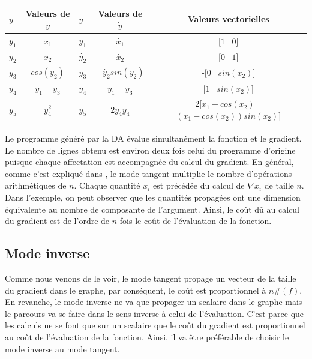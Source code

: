 \vspace{1cm}
\begin{tabular}{|l|c|l|c|c|}
  \hline
  $y$ & Valeurs de $y$ & $\dot{y}$ & Valeurs de $\dot{y}$ & Valeurs vectorielles
\\
  \hline
  $y_1$ &  $x_1$ &  $\dot{y_1}$ & $\dot{x_1}$ & [$1$ \ $0$] \\
  $y_2$ & $x_2$ & $\dot{y_2}$ & $\dot{x_2}$ & [$0$ \ $1$] \\
  $y_3$ & $cos(y_2)$ & $\dot{y_3}$ & $-\dot{y_2}sin(y_2)$ & -[$0$ \ $sin(x_2)$]
\\
  $y_4$ & $y_1-y_3$ & $\dot{y_4}$ & $\dot{y_1}-\dot{y_3}$ & [$1$ \ $sin(x_2)$]
\\
  $y_5$ & $y_4^2$ &  $\dot{y_5}$ & $2\dot{y_4}y_4$ & $2$[$x_1-cos(x_2)$ \
$(x_1-cos(x_2))sin(x_2)$]\\
  
  \hline
\end{tabular}



\vspace{1cm}

Le programme g\'en\'er\'e par la DA \'evalue simultan\'ement la fonction et le gradient. Le nombre de lignes obtenu
est environ deux fois celui du programme d'origine puisque chaque affectation est accompagn\'ee du calcul du
gradient. En g\'en\'eral, comme c'est expliqu\'e dans \cite{Iri89onautomatic}, le mode tangent multiplie le nombre
 d'op\'erations arithm\'etiques de $n$. Chaque quantit\'e 
$x_i$ est pr\'ec\'ed\'ee du calcul de $\nabla x_i$ de taille $n$. Dans l'exemple, on peut observer que les quantit\'es propag\'ees ont 
une dimension \'equivalente au nombre de composante de l'argument. Ainsi, le coût dû au calcul du gradient est de l'ordre de 
$n$ fois le co\^ut de l'\'evaluation de la fonction.
\vspace{0.51cm}




% 

    \subsection{Mode inverse}
{\co Comme nous venons de le voir, le mode tangent propage un vecteur de la taille du gradient dans le graphe, par cons\'equent, le coût 
est proportionnel \`a $n\#(f)$. En revanche, le mode inverse ne va que propager un scalaire dans le graphe mais le parcours va se faire dans le 
sens inverse \`a celui de l'\'evaluation. C'est parce que les calculs ne se font que sur un scalaire que le coût du gradient est proportionnel
 au coût de l'\'evaluation de la fonction. 
Ainsi, il va être pr\'ef\'erable de choisir le mode inverse au mode tangent.}

